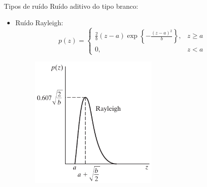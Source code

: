 \begin{slide}[toc=]{Tipos de ruído}
Ruído aditivo do tipo branco:
		{
		\begin{itemize}
			\item Ruído Rayleigh:
				\begin{equation*}
					p(z)=\begin{cases}
						\frac{2}{b}(z-a)\exp\left\{-\frac{(z-a)^2}{b}\right\}, & z\geq a\\
						0, & z<a
					\end{cases}
				\end{equation*}
				\begin{figure}[b!]
					\centering
					\includegraphics[width=0.6\textwidth]{figs/5-02b}
				\end{figure}
		\end{itemize}}
\end{slide}

